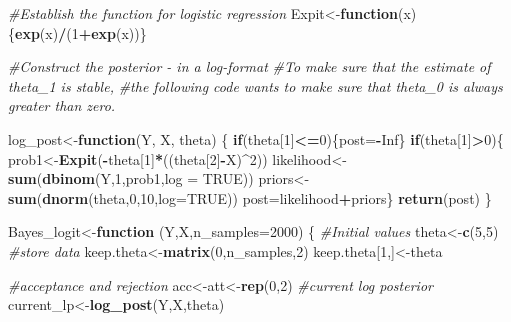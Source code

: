 \documentclass[]{book}
\newenvironment{Shaded}{\begin{snugshade}}{\end{snugshade}}
\newcommand{\KeywordTok}[1]{\textcolor[rgb]{0.13,0.29,0.53}{\textbf{#1}}}
\newcommand{\DataTypeTok}[1]{\textcolor[rgb]{0.13,0.29,0.53}{#1}}
\newcommand{\DecValTok}[1]{\textcolor[rgb]{0.00,0.00,0.81}{#1}}
\newcommand{\CommentTok}[1]{\textcolor[rgb]{0.56,0.35,0.01}{\textit{#1}}}
\newcommand{\OtherTok}[1]{\textcolor[rgb]{0.56,0.35,0.01}{#1}}
\newcommand{\ControlFlowTok}[1]{\textcolor[rgb]{0.13,0.29,0.53}{\textbf{#1}}}
\newcommand{\OperatorTok}[1]{\textcolor[rgb]{0.81,0.36,0.00}{\textbf{#1}}}
\newcommand{\NormalTok}[1]{#1}
\begin{document}
\begin{Shaded}
\begin{Highlighting}[]
\CommentTok{#Establish the function for logistic regression}
\NormalTok{Expit<-}\ControlFlowTok{function}\NormalTok{(x)\{}\KeywordTok{exp}\NormalTok{(x)}\OperatorTok{/}\NormalTok{(}\DecValTok{1}\OperatorTok{+}\KeywordTok{exp}\NormalTok{(x))\}}

\CommentTok{#Construct the posterior - in a log-format}
\CommentTok{#To make sure that the estimate of theta_1 is stable, }
\CommentTok{#the following code wants to make sure that theta_0 is always greater than zero.}

\NormalTok{log_post<-}\ControlFlowTok{function}\NormalTok{(Y, X, theta)}
\NormalTok{  \{}
  \ControlFlowTok{if}\NormalTok{(theta[}\DecValTok{1}\NormalTok{]}\OperatorTok{<=}\DecValTok{0}\NormalTok{)\{post=}\OperatorTok{-}\OtherTok{Inf}\NormalTok{\}}
  \ControlFlowTok{if}\NormalTok{(theta[}\DecValTok{1}\NormalTok{]}\OperatorTok{>}\DecValTok{0}\NormalTok{)\{}
\NormalTok{  prob1<-}\KeywordTok{Expit}\NormalTok{(}\OperatorTok{-}\NormalTok{theta[}\DecValTok{1}\NormalTok{]}\OperatorTok{*}\NormalTok{((theta[}\DecValTok{2}\NormalTok{]}\OperatorTok{-}\NormalTok{X)}\OperatorTok{^}\DecValTok{2}\NormalTok{))}
\NormalTok{  likelihood<-}\KeywordTok{sum}\NormalTok{(}\KeywordTok{dbinom}\NormalTok{(Y,}\DecValTok{1}\NormalTok{,prob1,}\DataTypeTok{log =} \OtherTok{TRUE}\NormalTok{))}
\NormalTok{  priors<-}\KeywordTok{sum}\NormalTok{(}\KeywordTok{dnorm}\NormalTok{(theta,}\DecValTok{0}\NormalTok{,}\DecValTok{10}\NormalTok{,}\DataTypeTok{log=}\OtherTok{TRUE}\NormalTok{))}
\NormalTok{  post=likelihood}\OperatorTok{+}\NormalTok{priors\}}
  \KeywordTok{return}\NormalTok{(post)}
\NormalTok{   \}}

\NormalTok{Bayes_logit<-}\ControlFlowTok{function}\NormalTok{ (Y,X,}\DataTypeTok{n_samples=}\DecValTok{2000}\NormalTok{)}
\NormalTok{\{}
\CommentTok{#Initial values}
\NormalTok{  theta<-}\KeywordTok{c}\NormalTok{(}\DecValTok{5}\NormalTok{,}\DecValTok{5}\NormalTok{)}
\CommentTok{#store data}
\NormalTok{  keep.theta<-}\KeywordTok{matrix}\NormalTok{(}\DecValTok{0}\NormalTok{,n_samples,}\DecValTok{2}\NormalTok{)}
\NormalTok{  keep.theta[}\DecValTok{1}\NormalTok{,]<-theta}
  
\CommentTok{#acceptance and rejection  }
\NormalTok{  acc<-att<-}\KeywordTok{rep}\NormalTok{(}\DecValTok{0}\NormalTok{,}\DecValTok{2}\NormalTok{)}
\CommentTok{#current log posterior}
\NormalTok{  current_lp<-}\KeywordTok{log_post}\NormalTok{(Y,X,theta)}


\end{Highlighting}
\end{Shaded}
\end{document}
